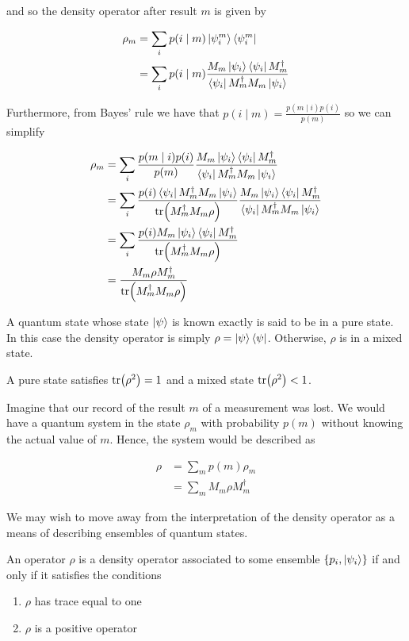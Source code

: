 \documentclass[main.tex]{subfiles}
\begin{document}
\begin{subappendices}
and so the density operator after result $m$ is given by

\begin{align*}
	\rho_m &= \sum_i p(i \mid m ) \ket{\psi_i^m} \bra{\psi_i^m} \\
	&= \sum_i p(i \mid m )\frac{M_m \ket{\psi_i}\bra{\psi_i}M_m^\dag}{\bra{\psi_i}M_m^\dag M_m\ket{\psi_i}}
\end{align*}

Furthermore, from Bayes' rule we have that $p(i \mid m) = \frac{p(m \mid i)p(i)}{p(m)}$ so we can simplify

\begin{align*}
	\rho_m &= \sum_i \frac{p(m \mid i)p(i)}{p(m)}\frac{M_m \ket{\psi_i}\bra{\psi_i}M_m^\dag}{\bra{\psi_i}M_m^\dag M_m\ket{\psi_i}} \\
	&= \sum_i \frac{p(i)\bra{\psi_i} M_m^\dag M_m \ket{\psi_i}}{\tr(M_m^\dag M_m \rho)}\frac{M_m \ket{\psi_i}\bra{\psi_i}M_m^\dag}{\bra{\psi_i}M_m^\dag M_m\ket{\psi_i}} \\
	&= \sum_i \frac{p(i)M_m \ket{\psi_i}\bra{\psi_i}M_m^\dag}{\tr(M_m^\dag M_m \rho)} \\
	&= \frac{M_m\rho M_m^\dag}{\tr(M_m^\dag M_m \rho)}
\end{align*}

A quantum state whose state $\ket{\psi}$ is known exactly is said to be in a pure state. In this case the density operator is simply $\rho = \ket{\psi}\bra{\psi}$. Otherwise, $\rho$ is in a mixed state.

A pure state satisfies $\tr(\rho^2) = 1$ and a mixed state $\tr(\rho^2) < 1$.

Imagine that our record of the result $m$ of a measurement was lost. We would have a quantum system in the state $\rho_m$ with probability $p(m)$ without knowing the actual value of $m$. Hence, the system would be described as

\begin{align*}
\rho &= \sum_m p(m) \rho_m	\\
&= \sum_m M_m \rho M_m^\dag 
\end{align*}

We may wish to move away from the interpretation of the density operator as a means of describing ensembles of quantum states.

\begin{theorem}
An operator $\rho$ is a density operator associated to some ensemble $\{p_i, \ket{\psi_i}\}$ if and only if it satisfies the conditions

\begin{enumerate}
\item $\rho$ has trace equal to one
\item $\rho$ is a positive operator	
\end{enumerate}


\end{theorem}
\end{subappendices}
\end{document}
